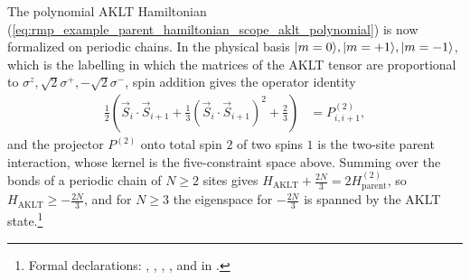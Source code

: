 \documentclass{article}
\begin{document}
The polynomial AKLT Hamiltonian
(\ref{eq:rmp_example_parent_hamiltonian_scope_aklt_polynomial}) is now
formalized on periodic chains. In the physical basis
$|m=0\rangle,|m=+1\rangle,|m=-1\rangle$, which is the labelling in which the
matrices of the AKLT tensor are proportional to
$\sigma^z,\sqrt2\sigma^+,-\sqrt2\sigma^-$, spin addition gives the
operator identity
\begin{align}
    \frac12\left(\vec S_i\cdot\vec S_{i+1}
        +\frac13\left(\vec S_i\cdot\vec S_{i+1}\right)^2
        +\frac23\right)
        &= P^{(2)}_{i,i+1},
    \label{eq:rmp_example_parent_hamiltonian_scope_aklt_spin_two}
\end{align}
and the projector $P^{(2)}$ onto total spin $2$ of two spins $1$ is the two-site
parent interaction, whose kernel is the five-constraint space above. Summing
over the bonds of a periodic chain of $N\ge2$ sites gives
$H_{\mathrm{AKLT}}+\tfrac{2N}{3}=2H^{(2)}_{\mathrm{parent}}$, so
$H_{\mathrm{AKLT}}\ge-\tfrac{2N}{3}$, and for $N\ge3$ the eigenspace for
$-\tfrac{2N}{3}$ is spanned by the AKLT state.\footnote{Formal declarations:
,
,
,
, and
 in
.}
\end{document}
